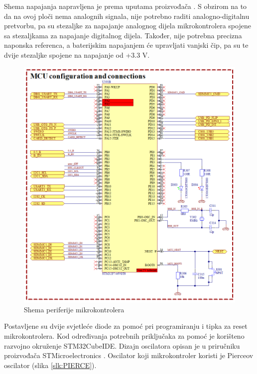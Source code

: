 Shema napajanja napravljena je prema uputama proizvođača \cite{stmicroelectronics:an4661}. S obzirom na to da na ovoj ploči nema analognih signala, nije potrebno raditi analogno-digitalnu pretvorbu, pa su stezaljke za napajanje analognog dijela mikrokontrolera spojene sa stezaljkama za napajanje digitalnog dijela. Također, nije potrebna precizna naponska referenca, a baterijskim napajanjem će upravljati vanjski čip, pa su te dvije stezaljke spojene na napajanje od +3.3 V.
\begin{figure}[H]
    \centering
    \includegraphics[width=\textwidth]{Figures/MCU_01.png}
    \caption{Shema periferije mikrokontrolera}
    \label{slk:MCU_PE}
\end{figure}
Postavljene su dvije svjetleće diode za pomoć pri programiranju i tipka za reset mikrokontrolera. Kod određivanja potrebnih priključaka za pomoć je korišteno razvojno okruženje STM32CubeIDE. Dizajn oscilatora opisan je u priručniku proizvođača STMicroelectronics \cite{stmicroelectronics:an2867}. Oscilator koji mikrokontroler koristi je Pierceov oscilator (slika \ref{slk:PIERCE}).
